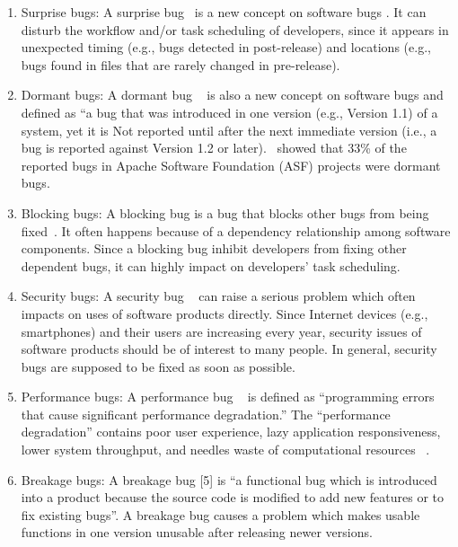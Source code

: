 \documentclass[conference]{IEEEtran}
\begin{document}
\begin{enumerate}
\item Surprise bugs: A surprise bug~\cite{Shihab:2011} is a new concept on software bugs . It can disturb the workflow and/or task scheduling of developers, since it appears in unexpected timing (e.g., bugs detected in post-release) and locations (e.g., bugs found in files that are rarely changed in pre-release).
\item Dormant bugs: A dormant bug ~\cite{Chen:2014} is also a new concept on software bugs and defined as “a bug that was introduced in one version (e.g., Version 1.1) of a system, yet it is Not reported until after the next immediate version (i.e., a bug is reported against Version 1.2 or later).~\cite{Sun:2010} showed that 33\% of the reported bugs in Apache Software Foundation (ASF) projects were dormant bugs.

\item Blocking bugs: A blocking bug is a bug that blocks other bugs from being fixed~\cite{ValdiviaGarcia:2014}. It often happens because of a dependency relationship among software components. Since a blocking bug inhibit developers from fixing other dependent bugs, it can highly impact on developers’ task scheduling. 

\item Security bugs: A security bug ~\cite{Gegick:2010} can raise a serious problem which often impacts on uses of software products directly. Since Internet devices (e.g., smartphones) and their users are increasing every year, security issues of software products should be of interest to many people. In general, security bugs are supposed to be fixed as soon as possible. 

\item Performance bugs: A performance bug ~\cite{Nistor:2013} is defined as “programming errors that cause significant performance degradation.” The “performance degradation” contains poor user experience, lazy application responsiveness, lower system throughput, and needles waste of computational resources ~\cite{Molyneaux:2009}. 

\item Breakage bugs: A breakage bug [5] is “a functional bug which is introduced into a product because the source code is modified to add new features or to fix existing bugs”.  A breakage bug causes a problem which makes usable functions in one version unusable after releasing newer versions.
\end{enumerate}
\end{document}
